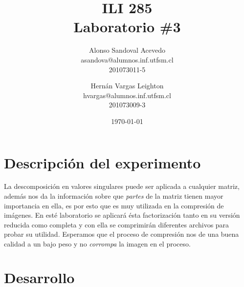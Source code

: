 \documentclass[spanish, fleqn]{article}
\title{ILI 285 \\ Laboratorio \#3}
\author{Alonso Sandoval Acevedo\\asandova@alumnos.inf.utfsm.cl\\201073011-5 \and 
		Hernán Vargas Leighton\\hvargas@alumnos.inf.utfsm.cl\\201073009-3}
\date{\today}
\begin{document}
\maketitle

\thispagestyle{empty}

\section{Descripción del experimento}
	La descomposición en valores singulares puede ser aplicada a cualquier 
	matriz, además nos da la información sobre que \textit{partes} de la matriz
	tienen mayor importancia en ella, es por esto que es muy utilizada en la
	compresión de imágenes. En esté laboratorio se aplicará ésta factorización
	tanto en su versión reducida como completa y con ella se comprimirán
	diferentes archivos para probar su utilidad. Esperamos que el proceso de
	compresión nos de una buena calidad a un bajo peso y no \textit{corrompa} 
	la imagen en el proceso.
\section{Desarrollo}
\end{document}
